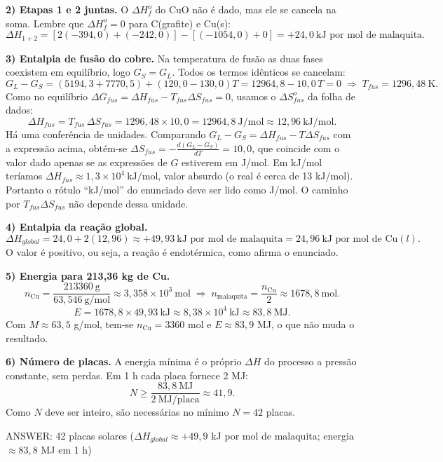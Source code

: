 \documentclass{article}%
\begin{document}
\textbf{2) Etapas 1 e 2 juntas.} O $\Delta H_f^o$ do CuO não é dado, mas ele se cancela na soma. Lembre que $\Delta H_f^o = 0$ para C(grafite) e Cu(s):
\[
\Delta H_{1+2} = \left[2(-394{,}0) + (-242{,}0)\right] - \left[(-1054{,}0) + 0\right] = +24{,}0\ \text{kJ por mol de malaquita}.
\]

\textbf{3) Entalpia de fusão do cobre.} Na temperatura de fusão as duas fases coexistem em equilíbrio, logo $G_S = G_L$. Todos os termos idênticos se cancelam:
\[
G_L - G_S = (5194{,}3 + 7770{,}5) + (120{,}0 - 130{,}0)T = 12964{,}8 - 10{,}0\,T = 0
\;\Longrightarrow\; T_{fus} = 1296{,}48\ \text{K}.
\]
Como no equilíbrio $\Delta G_{fus} = \Delta H_{fus} - T_{fus}\Delta S_{fus} = 0$, usamos o $\Delta S^o_{fus}$ da folha de dados:
\[
\Delta H_{fus} = T_{fus}\,\Delta S_{fus} = 1296{,}48 \times 10{,}0 = 12964{,}8\ \text{J/mol} \approx 12{,}96\ \text{kJ/mol}.
\]
Há uma conferência de unidades. Comparando $G_L - G_S = \Delta H_{fus} - T\Delta S_{fus}$ com a expressão acima, obtém-se $\Delta S_{fus} = -\frac{d(G_L - G_S)}{dT} = 10{,}0$, que coincide com o valor dado apenas se as expressões de $G$ estiverem em J/mol. Em kJ/mol teríamos $\Delta H_{fus} \approx 1{,}3\times 10^{4}\ \text{kJ/mol}$, valor absurdo (o real é cerca de 13 kJ/mol). Portanto o rótulo ``kJ/mol'' do enunciado deve ser lido como J/mol. O caminho por $T_{fus}\Delta S_{fus}$ não depende dessa unidade.

\textbf{4) Entalpia da reação global.}
\[
\Delta H_{global} = 24{,}0 + 2(12{,}96) \approx +49{,}93\ \text{kJ por mol de malaquita} = 24{,}96\ \text{kJ por mol de Cu}(l).
\]
O valor é positivo, ou seja, a reação é endotérmica, como afirma o enunciado.

\textbf{5) Energia para 213,36 kg de Cu.}
\[
n_{\text{Cu}} = \frac{213360\ \text{g}}{63{,}546\ \text{g/mol}} \approx 3{,}358\times 10^{3}\ \text{mol}
\;\Longrightarrow\; n_{\text{malaquita}} = \frac{n_{\text{Cu}}}{2} \approx 1678{,}8\ \text{mol}.
\]
\[
E = 1678{,}8 \times 49{,}93\ \text{kJ} \approx 8{,}38\times 10^{4}\ \text{kJ} \approx 83{,}8\ \text{MJ}.
\]
Com $M \approx 63{,}5$ g/mol, tem-se $n_{\text{Cu}} = 3360$ mol e $E \approx 83{,}9$ MJ, o que não muda o resultado.

\textbf{6) Número de placas.} A energia mínima é o próprio $\Delta H$ do processo a pressão constante, sem perdas. Em 1 h cada placa fornece 2 MJ:
\[
N \ge \frac{83{,}8\ \text{MJ}}{2\ \text{MJ/placa}} \approx 41{,}9.
\]
Como $N$ deve ser inteiro, são necessárias no mínimo $N = 42$ placas.

ANSWER: 42 placas solares ($\Delta H_{global} \approx +49{,}9$ kJ por mol de malaquita; energia $\approx 83{,}8$ MJ em 1 h)%
\newpage%
\end{document}
